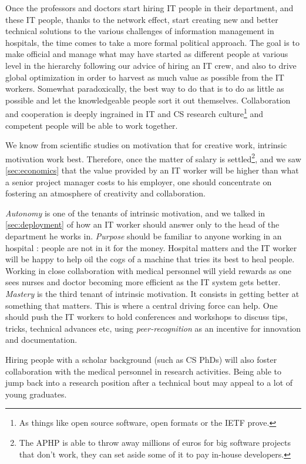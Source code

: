 \documentclass[nobib]{tufte-handout}
\begin{document}
Once the professors and doctors start hiring IT people in their department, and these IT people, thanks to the network effect, start creating new and better technical solutions to the various challenges of information management in hospitals, the time comes to take a more formal political approach. The goal is to make official and manage what may have started as different people at various level in the hierarchy following our advice of hiring an IT crew, and also to drive global optimization in order to harvest as much value as possible from the IT workers. Somewhat paradoxically, the best way to do that is to do as little as possible and let the knowledgeable people sort it out themselves. Collaboration and cooperation is deeply ingrained in IT and CS research culture\footnote{As things like open source software, open formats \cite{openformats} or the IETF \cite{ietf} prove.} and competent people will be able to work together.

We know from scientific studies \cite{pink2011drive} on motivation that for creative work, intrinsic motivation work best. Therefore, once the matter of salary is settled\footnote{The APHP is able to throw away millions of euros for big software projects that don't work, they can set aside some of it to pay in-house developers.}, and we saw \autoref{sec:economics} that the value provided by an IT worker will be higher than what a senior project manager costs to his employer, one should concentrate on fostering an atmosphere of creativity and collaboration.

\emph{Autonomy} is one of the tenants of intrinsic motivation, and we talked in \autoref{sec:deployment} of how an IT worker should answer only to the head of the department he works in. \emph{Purpose} should be familiar to anyone working in an hospital : people are not in it for the money. Hospital matters and the IT worker will be happy to help oil the cogs of a machine that tries its best to heal people. Working in close collaboration with medical personnel will yield rewards as one sees nurses and doctor becoming more efficient as the IT system gets better. \emph{Mastery} is the third tenant of intrinsic motivation. It consists in getting better at something that matters. This is where a central driving force can help. One should push the IT workers to hold conferences and workshops to discuss tips, tricks, technical advances etc, using \emph{peer-recognition} as an incentive for innovation and documentation.

Hiring people with a scholar background (such as CS PhDs) will also foster collaboration with the medical personnel in research activities. Being able to jump back into a research position after a technical bout may appeal to a lot of young graduates.
\end{document}
